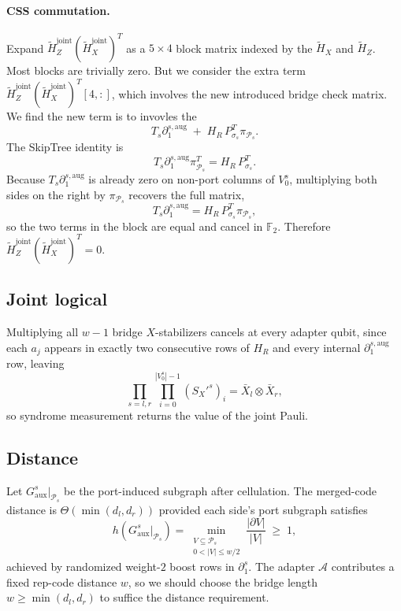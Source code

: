 \documentclass[a4paper, 12pt]{article}
\begin{document}
  \paragraph{CSS commutation.}
Expand $\tilde H_Z^{\mathrm{joint}} (\tilde H_X^{\mathrm{joint}})^T$ as a
  $5 \times 4$ block matrix indexed by the $\tilde H_X$ and $\tilde H_Z$.
  Most blocks are trivially zero. But we consider the extra term $\tilde H_Z^{\mathrm{joint}} (\tilde H_X^{\mathrm{joint}})^T[4,:]$, which involves the new introduced bridge check matrix. We find the new term is to invovles the 
  \begin{equation}
  T_s \partial_1^{s,\mathrm{aug}} \;+\; H_R\, P_{\sigma_s}^T \pi_{\mathcal{P}_s}.
  \end{equation}
  The SkipTree identity is
  \begin{equation}
  T_s \partial_1^{s,\mathrm{aug}} \pi_{\mathcal{P}_s}^T = H_R\, P_{\sigma_s}^T.
  \end{equation}
  Because
  $T_s \partial_1^{s,\mathrm{aug}}$ is already zero on non-port columns of
  $V_0^s$, multiplying both sides on the right by $\pi_{\mathcal{P}_s}$ recovers
  the full matrix,
  \begin{equation}
  T_s \partial_1^{s,\mathrm{aug}} = H_R\, P_{\sigma_s}^T \pi_{\mathcal{P}_s},
  \end{equation}
  so the two terms in the block are equal and cancel in $\mathbb{F}_2$. Therefore $\tilde H_Z^{\mathrm{joint}} (\tilde H_X^{\mathrm{joint}})^T = 0$.

  \subsection{Joint logical}
  Multiplying all $w-1$ bridge $X$-stabilizers cancels at every adapter qubit, since each $a_j$ appears in exactly
  two consecutive rows of $H_R$ and every internal $\partial_1^{s,\mathrm{aug}}$ row, leaving
  \begin{equation}
  \prod_{s=l,r}\prod_{i=0}^{|V_0^s|-1} (S_{X}'^s)_i = 
   \bar X_l \otimes \bar X_r,
  \end{equation}
  so syndrome measurement returns the value of the joint Pauli.

  \subsection{Distance}
  Let $G_{\mathrm{aux}}^s|_{\mathcal{P}_s}$ be the port-induced subgraph after cellulation. The
  merged-code distance is $\Theta(\min(d_l, d_r))$ provided each side's port subgraph satisfies
  \begin{equation}
  h(G_{\mathrm{aux}}^s|_{\mathcal{P}_s}) = \min_{\substack{V \subseteq \mathcal{P}_s \\ 0 < |V| \leq w/2}} \frac{|\partial V|}{|V|}
  \;\geq\; 1,
  \end{equation}
  achieved by randomized weight-$2$ boost rows in $\partial_1^{s}$. The adapter $\mathcal{A}$ contributes a
   fixed rep-code distance $w$, so we should choose the bridge length $w \geq \min(d_l, d_r)$ to suffice the distance requirement.
\end{document}
